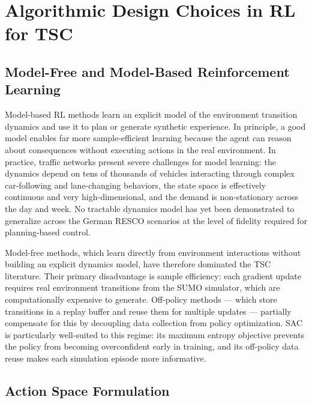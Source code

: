 \section{Algorithmic Design Choices in RL for TSC}
\label{sec:LiteratureReview_RLAndMARL}

\subsection{Model-Free and Model-Based Reinforcement Learning}
\label{sec:LiteratureReview_ModelFreeModelBased}

Model-based RL methods learn an explicit model of the environment transition dynamics and use it to plan or generate synthetic experience. In principle, a good model enables far more sample-efficient learning because the agent can reason about consequences without executing actions in the real environment. In practice, traffic networks present severe challenges for model learning: the dynamics depend on tens of thousands of vehicles interacting through complex car-following and lane-changing behaviors, the state space is effectively continuous and very high-dimensional, and the demand is non-stationary across the day and week. No tractable dynamics model has yet been demonstrated to generalize across the German RESCO scenarios at the level of fidelity required for planning-based control.

Model-free methods, which learn directly from environment interactions without building an explicit dynamics model, have therefore dominated the TSC literature. Their primary disadvantage is sample efficiency: each gradient update requires real environment transitions from the SUMO simulator, which are computationally expensive to generate. Off-policy methods — which store transitions in a replay buffer and reuse them for multiple updates — partially compensate for this by decoupling data collection from policy optimization. SAC \citep{haarnoja2018soft} is particularly well-suited to this regime: its maximum entropy objective prevents the policy from becoming overconfident early in training, and its off-policy data reuse makes each simulation episode more informative.

\subsection{Action Space Formulation}
\label{sec:LiteratureReview_ActionSpaces}

